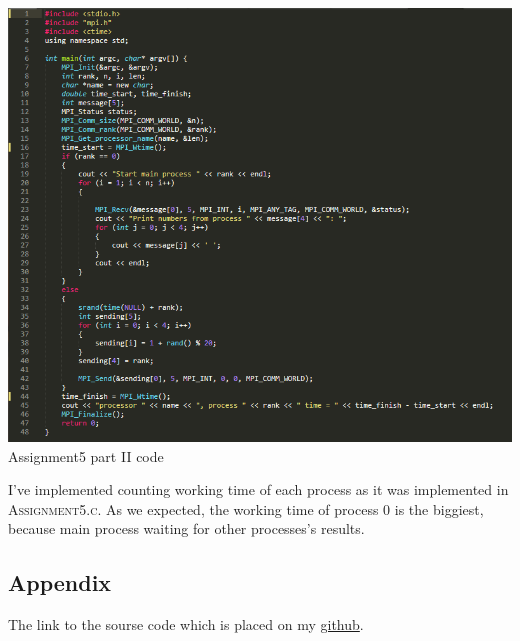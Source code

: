 \documentclass[%
12pt, %
final, %
oneside, %
onecolumn, %
centertags]{article} %
\theoremstyle{plain}
\theoremstyle{definition}
\theoremstyle{remark}
\begin{document}
\begin{center}
\includegraphics[scale=0.7]{5.2.code.png}
Assignment5 part II code
\end{center}

I've implemented counting working time of each process as it was implemented in \textsc{Assignment5.c}. As we expected, the working time of process $0$ is the biggiest, because main process waiting for other processes's results.



\subsection{Appendix}

The link to the sourse code which is placed on my \href{https://github.com/aptmess/parallel_algorithms}{github}.
\end{document}
